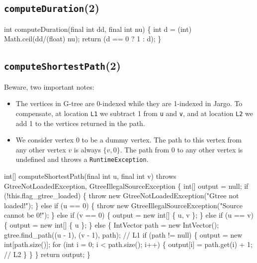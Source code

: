 \subsection{\texttt{computeDuration}(2)}
\nwenddocs{}\endmoddef{}
int computeDuration(final int dd, final int nu) \{
  int d = (int) Math.ceil(dd/(float) nu);
  return (d == 0 ? 1 : d);
\}
\nwendcode{}\nwdocspar

\subsection{\texttt{computeShortestPath}(2)}
Beware, two important notes:
\begin{itemize}
\item The vertices in G-tree are 0-indexed while they are 1-indexed in Jargo.  To
compensate, at location {\tt{}L1} we subtract 1 from {\tt{}u} and {\tt{}v}, and at
location {\tt{}L2} we add 1 to the vertices returned in the path.
\item We consider vertex 0 to be a dummy vertex. The path to this vertex
from any other vertex $v$ is always $\{v, 0\}$. The path from 0 to any other
vertex is undefined and throws a {\tt{}RuntimeException}.
\end{itemize}
\nwenddocs{}\endmoddef{}
int[] computeShortestPath(final int u, final int v)
throws GtreeNotLoadedException, GtreeIllegalSourceException \{
  int[] output = null;
  if (!this.flag_gtree_loaded) \{
    throw new GtreeNotLoadedException("Gtree not loaded!");
  \} else if (u == 0) \{
    throw new GtreeIllegalSourceException("Source cannot be 0!");
  \} else if (v == 0) \{
    output = new int[] \{ u, v \};
  \} else if (u == v) \{
    output = new int[] \{ u \};
  \} else \{
    IntVector path = new IntVector();
    gtree.find_path((u - 1), (v - 1), path);        // L1
    if (path != null) \{
      output = new int[path.size()];
      for (int i = 0; i < path.size(); i++) \{
        output[i] = path.get(i) + 1;                // L2
      \}
    \}
  \}
  return output;
\}
\eatline
{}\nwendcode{}\nwdocspar
